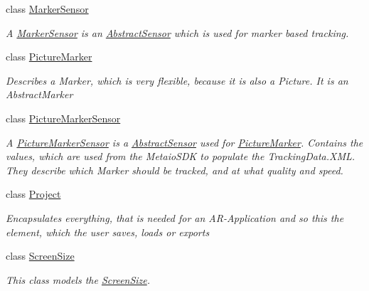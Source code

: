 \begin{DoxyCompactItemize}
class \hyperlink{class_a_rdev_kit_1_1_model_1_1_project_1_1_marker_sensor}{Marker\-Sensor}
\begin{DoxyCompactList}\small\item\em A \hyperlink{class_a_rdev_kit_1_1_model_1_1_project_1_1_marker_sensor}{Marker\-Sensor} is an \hyperlink{class_a_rdev_kit_1_1_model_1_1_project_1_1_abstract_sensor}{Abstract\-Sensor} which is used for marker based tracking. \end{DoxyCompactList}\item 
class \hyperlink{class_a_rdev_kit_1_1_model_1_1_project_1_1_picture_marker}{Picture\-Marker}
\begin{DoxyCompactList}\small\item\em Describes a Marker, which is very flexible, because it is also a Picture. It is an Abstract\-Marker \end{DoxyCompactList}\item 
class \hyperlink{class_a_rdev_kit_1_1_model_1_1_project_1_1_picture_marker_sensor}{Picture\-Marker\-Sensor}
\begin{DoxyCompactList}\small\item\em A \hyperlink{class_a_rdev_kit_1_1_model_1_1_project_1_1_picture_marker_sensor}{Picture\-Marker\-Sensor} is a \hyperlink{class_a_rdev_kit_1_1_model_1_1_project_1_1_abstract_sensor}{Abstract\-Sensor} used for \hyperlink{class_a_rdev_kit_1_1_model_1_1_project_1_1_picture_marker}{Picture\-Marker}. Contains the values, which are used from the Metaio\-S\-D\-K to populate the Tracking\-Data.\-X\-M\-L. They describe which Marker should be tracked, and at what quality and speed. \end{DoxyCompactList}\item 
class \hyperlink{class_a_rdev_kit_1_1_model_1_1_project_1_1_project}{Project}
\begin{DoxyCompactList}\small\item\em Encapsulates everything, that is needed for an A\-R-\/\-Application and so this the element, which the user saves, loads or exports \end{DoxyCompactList}\item 
class \hyperlink{class_a_rdev_kit_1_1_model_1_1_project_1_1_screen_size}{Screen\-Size}
\begin{DoxyCompactList}\small\item\em This class models the \hyperlink{class_a_rdev_kit_1_1_model_1_1_project_1_1_screen_size}{Screen\-Size}. \end{DoxyCompactList}\item 

\end{DoxyCompactItemize}
